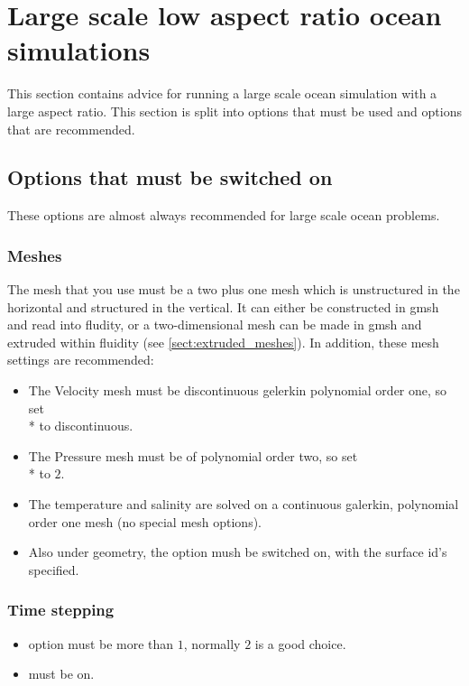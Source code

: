 \section{Large scale low aspect ratio ocean simulations}
\label{section:large-scale-ocean}

This section contains advice for running a large scale ocean simulation with a large aspect ratio. This section is split into options that must be used and options that are recommended.

\subsection{Options that must be switched on}
These options are almost always recommended for large scale ocean problems.

\subsubsection{Meshes}

The mesh that you use must be a two plus one mesh which is unstructured in the horizontal and structured in the vertical.  It can either be constructed in gmsh and read into fludity, or a two-dimensional mesh can be made in gmsh and extruded within fluidity (see \ref{sect:extruded_meshes}). In addition, these mesh settings are recommended:
\begin{itemize}
\item The Velocity mesh must be discontinuous gelerkin polynomial order one, so set \\*  to discontinuous.  
\item The Pressure mesh must be of polynomial order two, so set 
\\*   to $2$.  
\item The temperature and salinity are solved on a continuous galerkin, polynomial order one mesh (no special mesh options).
\item Also under geometry, the  option mush be switched on, with the surface id's specified.
\end{itemize}

\subsubsection{Time stepping}
\begin{itemize}
\item {} option must be more than $1$, normally $2$ is a good choice.
\item {} must be on.
\end{itemize}

